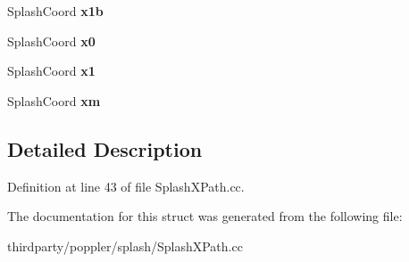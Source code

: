\begin{DoxyCompactItemize}
Splash\+Coord {\bfseries x1b}
\item 
\mbox{\label{struct_splash_x_path_adjust_a501e4ecb37b880ce758b93b927fed059}} 
Splash\+Coord {\bfseries x0}
\item 
\mbox{\label{struct_splash_x_path_adjust_aebed701f96d602f29fa98ca2ef3021da}} 
Splash\+Coord {\bfseries x1}
\item 
\mbox{\label{struct_splash_x_path_adjust_a0c7fb68788d3ecee03160f5c4a236387}} 
Splash\+Coord {\bfseries xm}
\end{DoxyCompactItemize}


\subsection{Detailed Description}


Definition at line 43 of file Splash\+X\+Path.\+cc.



The documentation for this struct was generated from the following file\+:\begin{DoxyCompactItemize}
\item 
thirdparty/poppler/splash/Splash\+X\+Path.\+cc\end{DoxyCompactItemize}
